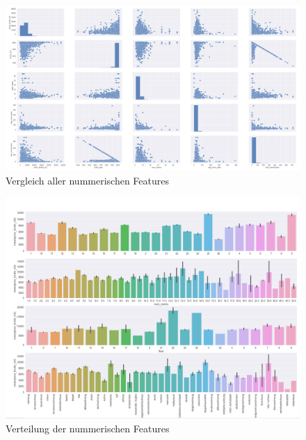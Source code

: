 \begin{figure}[h]
  \centering
  \includegraphics[width=\linewidth]{images/anhang/analysis/cross.png}
  \caption{Vergleich aller nummerischen Features} 
\end{figure}


\begin{figure}[h]
  \centering
  \includegraphics[width=\linewidth]{images/anhang/analysis/Verteilung.png}
  \caption{Verteilung der nummerischen Features} 
\end{figure}



